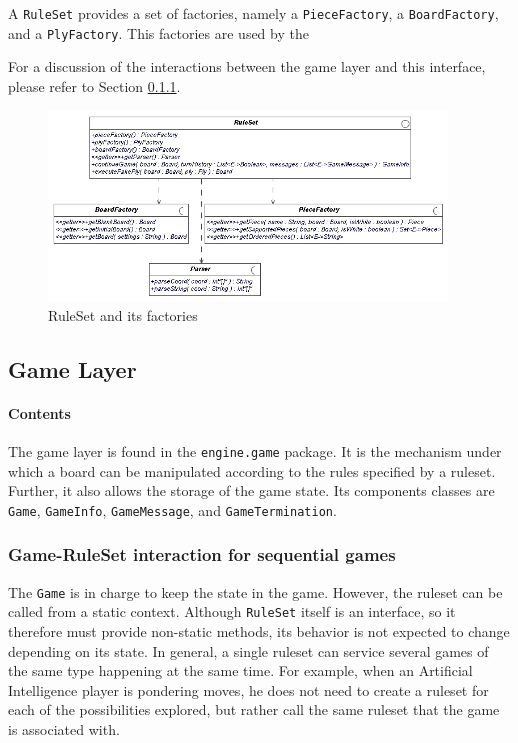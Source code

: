 													A \texttt{RuleSet} provides a set of factories, namely a \texttt{PieceFactory}, a 
													\texttt{BoardFactory}, and a \texttt{PlyFactory}. This factories are used by the
													
													For a discussion of the interactions between the game layer and this
													interface, please refer to Section \ref{game-discussion}. 
													
		\begin{figure}
			\begin{center}
				\includegraphics[width=300pt]{img/ruleset.png}
						\caption{RuleSet and its factories}
	  			\label{ruleset}
		   \end{center}
	\end{figure}
													
			
		\subsection{Game Layer}\label{game-layer}
	 		\paragraph{Contents}
		 		The game layer is found in the \texttt{engine.game} package. 
		 		It is the mechanism under which a board can be manipulated according to the rules
		 		specified by a ruleset. Further, it also allows the storage of the game state. 
		 		Its components classes are \texttt{Game}, \texttt{GameInfo}, \texttt{GameMessage}, 
		 		and \texttt{GameTermination}. 
	
		 		 \subsubsection{Game-RuleSet interaction for sequential games}\label{game-discussion}
					The \texttt{Game} is in charge to keep the state in the game. However, the ruleset can be
					called from a static context. Although \texttt{RuleSet} itself is an interface, so 
					it therefore must provide non-static methods, its behavior is not expected to change depending
					on its state. In general, a single ruleset can service several games of the same type happening 
					at the same time. For example, when an Artificial Intelligence player is pondering moves, 
					he does not need to create a ruleset for each of the possibilities explored, but rather
					call the same ruleset that the game is associated with. 

